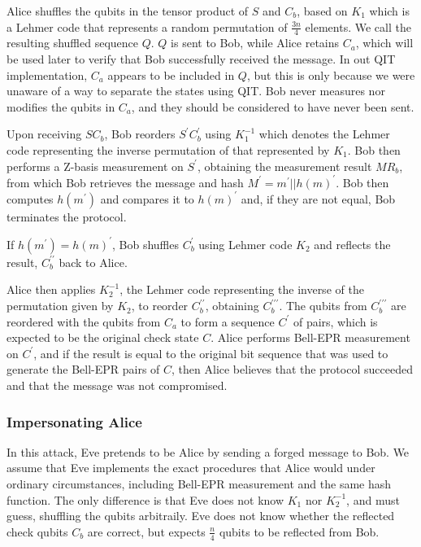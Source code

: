 \documentclass[conference,compsoc]{IEEEtran}
\begin{document}
Alice shuffles the qubits in the tensor product of $S$ and $C_{b}$,
based on $K_{1}$ which is a {\LARGE\color{red}Lehmer code} that represents a random permutation of $\frac{3n}{4}$ elements.%
We call the resulting shuffled sequence $Q$. $Q$ is sent to Bob, while Alice retains $C_{a}$,
which will be used later to verify that Bob successfully received the message. In out QIT implementation,
$C_{a}$ appears to be included in $Q$, but this is only because we were unaware of a way to separate the states
using QIT. Bob never measures nor modifies the qubits in $C_{a}$, and they should be considered to have never been sent.

Upon receiving $SC_{b}$, Bob reorders $S^{\prime}C_{b}^{\prime}$
using $K_{1}^{-1}$ which denotes the Lehmer code representing the inverse permutation of that represented by $K_{1}$.
Bob then performs a Z-basis measurement on $S^{\prime}$,
obtaining the measurement result $MR_{b}$, from which Bob retrieves
the message and hash $M^{\prime}=m^{\prime}||h\left(m\right)^{\prime}$.
Bob then computes $h\left(m^{\prime}\right)$ and compares it to $h\left(m\right)^{\prime}$
and, if they are not equal, Bob terminates the protocol.

If $h\left(m^{\prime}\right)=h\left(m\right)^{\prime}$, Bob shuffles
$C_{b}^{\prime}$ using Lehmer code $K_{2}$ and reflects the result, $C_{b}^{\prime\prime}$
back to Alice.

Alice then applies $K_{2}^{-1}$, the Lehmer code representing the inverse
of the permutation given by $K_{2}$, to reorder $C_{b}^{\prime\prime}$, obtaining
$C_{b}^{\prime\prime\prime}$. The qubits from $C_{b}^{\prime\prime\prime}$ are reordered
with the qubits from $C_{a}$ to form a sequence $C^{\prime}$ of pairs, which is expected to be the
original check state $C$. Alice performs Bell-EPR measurement on $C^{\prime}$, and if the result
is equal to the original bit sequence that was used to generate the Bell-EPR pairs of $C$,
then Alice believes that the protocol succeeded and that the message was not compromised.

\subsubsection{Impersonating Alice}

In this attack, Eve pretends to be Alice by sending a forged message to Bob.
We assume that Eve implements the exact procedures that Alice
would under ordinary circumstances, including Bell-EPR
measurement and the same hash function. The only difference is that Eve
does not know $K_{1}$ nor $K_{2}^{-1}$, and must guess, shuffling the
qubits arbitraily. Eve does not know whether the reflected check qubits $C_{b}$
are correct, but expects $\frac{n}{4}$ qubits to be reflected from Bob.
\end{document}
